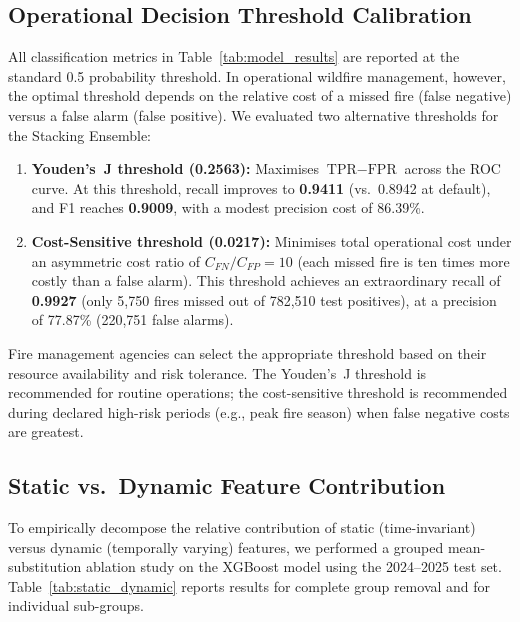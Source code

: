 \subsection{Operational Decision Threshold Calibration}
\label{sec:thresholds}

All classification metrics in Table~\ref{tab:model_results} are reported at the standard 0.5 probability threshold. In operational wildfire management, however, the optimal threshold depends on the relative cost of a missed fire (false negative) versus a false alarm (false positive). We evaluated two alternative thresholds for the Stacking Ensemble:

\begin{enumerate}
    \item \textbf{Youden's~J threshold (0.2563):} Maximises $\text{TPR} - \text{FPR}$ across the ROC curve. At this threshold, recall improves to \textbf{0.9411} (vs.\ 0.8942 at default), and F1 reaches \textbf{0.9009}, with a modest precision cost of 86.39\%.
    \item \textbf{Cost-Sensitive threshold (0.0217):} Minimises total operational cost under an asymmetric cost ratio of $C_{FN}/C_{FP} = 10$ (each missed fire is ten times more costly than a false alarm). This threshold achieves an extraordinary recall of \textbf{0.9927} (only 5,750 fires missed out of 782,510 test positives), at a precision of 77.87\% (220,751 false alarms).
\end{enumerate}

Fire management agencies can select the appropriate threshold based on their resource availability and risk tolerance. The Youden's~J threshold is recommended for routine operations; the cost-sensitive threshold is recommended during declared high-risk periods (e.g., peak fire season) when false negative costs are greatest.

\subsection{Static vs.\ Dynamic Feature Contribution}
\label{sec:static_dynamic}

To empirically decompose the relative contribution of static (time-invariant) versus dynamic (temporally varying) features, we performed a grouped mean-substitution ablation study on the XGBoost model using the 2024--2025 test set. Table~\ref{tab:static_dynamic} reports results for complete group removal and for individual sub-groups.

